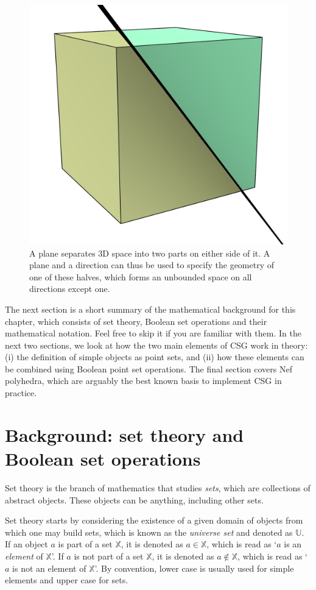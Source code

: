 \begin{figure}
\centering
\includegraphics[width=0.3\linewidth]{figs/halfspaces}
\caption{A plane separates 3D space into two parts on either side of it. A plane and a direction can thus be used to specify the geometry of one of these halves, which forms an unbounded space on all directions except one.}%
\label{fig:halfspaces}
\end{figure}

The next section is a short summary of the mathematical background for this chapter, which consists of set theory, Boolean set operations and their mathematical notation.
Feel free to skip it if you are familiar with them.
In the next two sections, we look at how the two main elements of CSG work in theory: (i) the definition of simple objects as point sets, and (ii) how these elements can be combined using Boolean point set operations.
The final section covers Nef polyhedra, which are arguably the best known basis to implement CSG in practice.

\section{Background: set theory and Boolean set operations}

Set theory is the branch of mathematics that studies \emph{sets}, which are collections of abstract objects.
These objects can be anything, including other sets.

Set theory starts by considering the existence of a given domain of objects from which one may build sets, which is known as the \emph{universe set} and denoted as \(\mathbb{U}\).
If an object \(a\) is part of a set \(\mathbb{X}\), it is denoted as \(a \in \mathbb{X}\), which is read as `\(a\) is an \emph{element} of \(\mathbb{X}\)'.
If \(a\) is not part of a set \(\mathbb{X}\), it is denoted as \(a \notin \mathbb{X}\), which is read as `\(a\) is not an element of \(\mathbb{X}\)'.
By convention, lower case is usually used for simple elements and upper case for sets.


